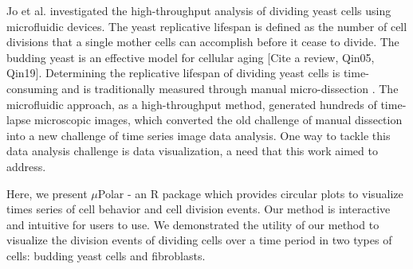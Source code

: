 \documentclass[conference]{IEEEtran}
\begin{document}
Jo et al. \cite{r3} investigated the high-throughput analysis of dividing yeast cells using microfluidic devices. 
The yeast replicative lifespan is defined as the number of cell divisions that a single mother cells can accomplish before it cease to divide. The budding yeast is an effective model for cellular aging [Cite a review, Qin05, Qin19]. Determining the replicative lifespan of dividing yeast cells is time-consuming and is traditionally  measured through manual micro-dissection \cite{ref08}. The microfluidic approach, as a high-throughput method, generated hundreds of time-lapse microscopic images, which converted the old challenge of manual dissection into a new challenge of time series image data analysis. One way to tackle 
this data analysis challenge is data visualization, a need that this work aimed to address. 



Here, we present $\mu$Polar - an R package which provides circular plots to visualize times series of cell behavior and cell division events. Our method is interactive and intuitive for users to use. We demonstrated the utility of our method to visualize the division events of dividing cells over a time period in two types of cells: budding yeast cells and fibroblasts. 
\end{document}

